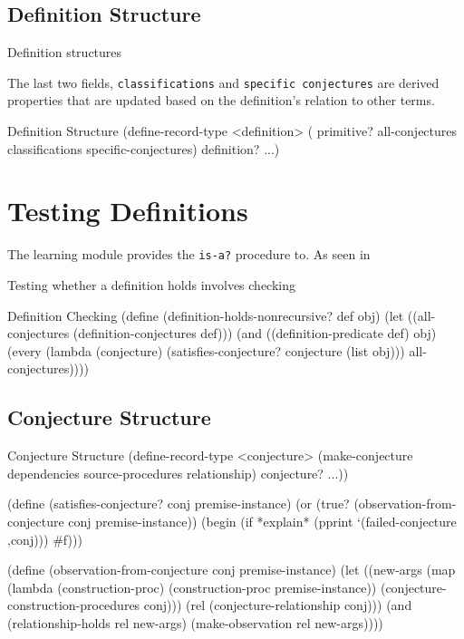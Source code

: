 \subsection{Definition Structure}

Definition structures

The last two fields, \texttt{classifications} and
\texttt{specific conjectures} are derived properties that are updated
based on the definition's relation to other terms.

\begin{code-listing}
[label=def-struct]
{Definition Structure}
(define-record-type <definition>
  (%
                     primitive?
                     all-conjectures
                     classifications specific-conjectures)
  definition?
  ...)
\end{code-listing}


\section{Testing Definitions}

The learning module provides the \texttt{is-a?} procedure to. As seen
in

Testing whether a definition holds involves checking

\begin{code-listing}
[label=def-holds]
{Definition Checking}
(define (definition-holds-nonrecursive? def obj)
  (let ((all-conjectures (definition-conjectures def)))
    (and ((definition-predicate def) obj)
         (every (lambda (conjecture)
                  (satisfies-conjecture? conjecture (list obj)))
                all-conjectures))))
\end{code-listing}

\subsection{Conjecture Structure}

\begin{code-listing}
[label=conj-struct]
{Conjecture Structure}
(define-record-type <conjecture>
  (make-conjecture dependencies source-procedures relationship)
  conjecture? ...))

(define (satisfies-conjecture? conj premise-instance)
  (or (true? (observation-from-conjecture conj premise-instance))
      (begin (if *explain* (pprint `(failed-conjecture ,conj)))
             #f)))

(define (observation-from-conjecture conj premise-instance)
  (let ((new-args
         (map (lambda (construction-proc)
                (construction-proc premise-instance))
          (conjecture-construction-procedures conj)))
        (rel (conjecture-relationship conj)))
    (and (relationship-holds rel new-args)
         (make-observation rel new-args))))
\end{code-listing}

